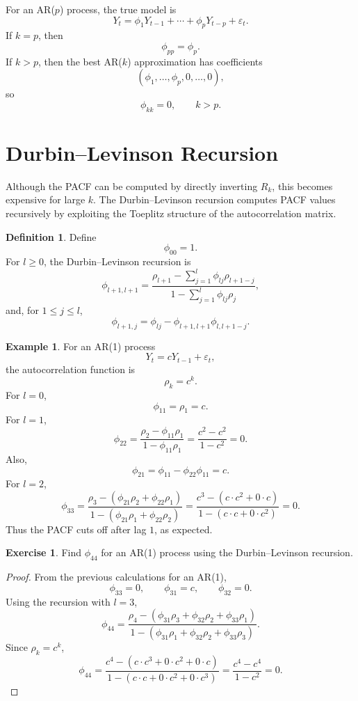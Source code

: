 \documentclass[12pt,oneside]{book}
\numberwithin{equation}{section}
\theoremstyle{definition}
\newtheorem{definition}{Definition}[section]
\newtheorem{example}{Example}[section]
\newtheorem{exercise}{Exercise}[section]
\theoremstyle{plain}
\theoremstyle{remark}
\begin{document}
For an AR($p$) process, the true model is
\[
Y_t=\phi_1Y_{t-1}+\cdots+\phi_pY_{t-p}+\varepsilon_t.
\]
If $k=p$, then
\[
\phi_{pp}=\phi_p.
\]
If $k>p$, then the best AR($k$) approximation has coefficients
\[
(\phi_1,\ldots,\phi_p,0,\ldots,0),
\]
so
\[
\phi_{kk}=0,
\qquad k>p.
\]

\section{Durbin--Levinson Recursion}

Although the PACF can be computed by directly inverting $R_k$, this becomes expensive for large $k$. The Durbin--Levinson recursion computes PACF values recursively by exploiting the Toeplitz structure of the autocorrelation matrix.

\begin{definition}
Define
\[
\phi_{00}=1.
\]
For $l\geq 0$, the Durbin--Levinson recursion is
\[
\phi_{l+1,l+1}
=
\frac{
\rho_{l+1}-\sum_{j=1}^{l}\phi_{lj}\rho_{l+1-j}
}{
1-\sum_{j=1}^{l}\phi_{lj}\rho_j
},
\]
and, for $1\leq j\leq l$,
\[
\phi_{l+1,j}
=
\phi_{lj}
-
\phi_{l+1,l+1}\phi_{l,l+1-j}.
\]
\end{definition}

\begin{example}
For an AR(1) process
\[
Y_t=cY_{t-1}+\varepsilon_t,
\]
the autocorrelation function is
\[
\rho_k=c^k.
\]
For $l=0$,
\[
\phi_{11}
=
\rho_1
=
c.
\]
For $l=1$,
\[
\phi_{22}
=
\frac{\rho_2-\phi_{11}\rho_1}{1-\phi_{11}\rho_1}
=
\frac{c^2-c^2}{1-c^2}
=
0.
\]
Also,
\[
\phi_{21}
=
\phi_{11}-\phi_{22}\phi_{11}
=
c.
\]
For $l=2$,
\[
\phi_{33}
=
\frac{\rho_3-(\phi_{21}\rho_2+\phi_{22}\rho_1)}
{1-(\phi_{21}\rho_1+\phi_{22}\rho_2)}
=
\frac{c^3-(c\cdot c^2+0\cdot c)}
{1-(c\cdot c+0\cdot c^2)}
=
0.
\]
Thus the PACF cuts off after lag $1$, as expected.
\end{example}

\begin{exercise}
Find $\phi_{44}$ for an AR(1) process using the Durbin--Levinson recursion.
\end{exercise}

\begin{proof}
From the previous calculations for an AR(1),
\[
\phi_{33}=0,
\qquad
\phi_{31}=c,
\qquad
\phi_{32}=0.
\]
Using the recursion with $l=3$,
\[
\phi_{44}
=
\frac{
\rho_4-(\phi_{31}\rho_3+\phi_{32}\rho_2+\phi_{33}\rho_1)
}{
1-(\phi_{31}\rho_1+\phi_{32}\rho_2+\phi_{33}\rho_3)
}.
\]
Since $\rho_k=c^k$,
\[
\phi_{44}
=
\frac{
c^4-(c\cdot c^3+0\cdot c^2+0\cdot c)
}{
1-(c\cdot c+0\cdot c^2+0\cdot c^3)
}
=
\frac{c^4-c^4}{1-c^2}
=
0.
\]
\end{proof}
\end{document}
